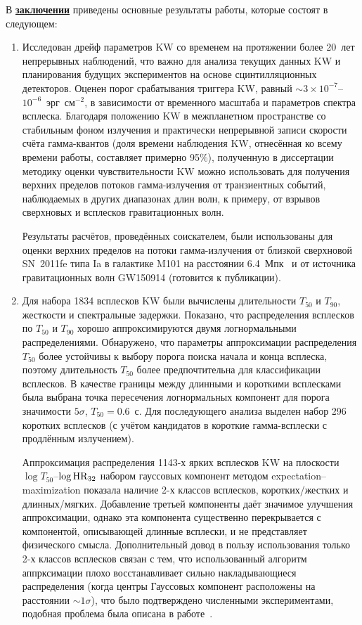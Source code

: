 В \underline{\textbf{заключении}} приведены основные результаты работы, 
которые состоят в следующем:
\begin{enumerate}
 
\item Исследован дрейф параметров KW со временем на протяжении более 20~лет непрерывных наблюдений,
    что важно для анализа текущих данных KW и планирования будущих экспериментов 
    на основе сцинтилляционных детекторов.
    Оценен порог срабатывания триггера KW, равный $\sim 3\times10^{-7}$--$10^{-6}$~эрг~см$^{-2}$,
    в зависимости от временного масштаба и параметров спектра всплеска. 
    Благодаря положению KW в межпланетном пространстве со стабильным 
    фоном излучения и практически непрерывной записи скорости счёта гамма-квантов 
    (доля времени наблюдения KW, отнесённая ко всему времени работы, составляет 
    примерно 95\%), полученную в диссертации методику оценки чувствительности KW
    можно использовать для получения верхних пределов потоков гамма-излучения  
    от транзиентных событий, наблюдаемых в других диапазонах длин волн, к примеру, 
    от взрывов сверхновых и всплесков гравитационных волн.
    
    Результаты расчётов, проведённых соискателем, были использованы для оценки верхних 
    пределов на потоки гамма-излучения от близкой сверхновой SN~2011fe типа Ia в 
    галактике M101 на расстоянии 6.4~Мпк~\citep{Margutti_2012ApJ} и от источника гравитационных
    волн GW150914 (готовится к публикации).
    
\item Для набора 1834 всплесков KW были вычислены длительности $T_{50}$ и $T_{90}$, жесткости 
    и спектральные задержки. Показано, что распределения 
    всплесков по $T_{50}$ и $T_{90}$ хорошо аппроксимируются двумя логнормальными 
    распределениями. Обнаружено, что параметры аппроксимации распределения $T_{50}$ 
    более устойчивы к выбору порога поиска начала и конца всплеска, поэтому длительность 
    $T_{50}$ более предпочтительна для классификации всплесков. В качестве границы между 
    длинными и короткими всплесками была выбрана точка пересечения логнормальных компонент 
    для порога значимости $5\sigma$, $T_{50} = 0.6$~с. 
    Для последующего анализа выделен набор 296 коротких всплесков (с учётом кандидатов 
    в короткие гамма-всплески с продлённым излучением). 
      
    Аппроксимация распределения 1143-х ярких всплесков KW на плоскости $\log T_{50}$--$\log {\mathrm{HR}}_{32}$ 
    набором гауссовых компонент методом expectation–maximization показала наличие 2-х 
    классов всплесков, коротких/жестких и длинных/мягких. 
    Добавление третьей компоненты даёт значимое улучшения аппроксимации, однако эта 
    компонента существенно перекрывается с компонентой, описывающей длинные всплески, 
    и не представляет физического смысла. Дополнительный довод в пользу использования
    только 2-х классов всплесков связан с тем, что использованный алгоритм аппрксимации
    плохо восстанавливает сильно накладывающиеся распределения 
    (когда центры Гауссовых компонент расположены на расстоянии $\sim 1\sigma$),
    что было подтверждено численными экспериментами, подобная проблема была
    описана в работе~\citep{Igoshev_2013MNRAS}.


\end{enumerate}
